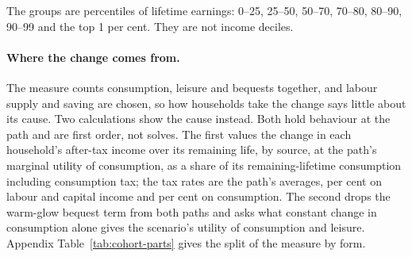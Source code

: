 The groups are percentiles of lifetime earnings: 0--25, 25--50, 50--70, 70--80, 80--90, 90--99 and the top 1 per cent. They are not income deciles.

\paragraph{Where the change comes from.} The measure counts consumption, leisure and bequests together, and labour supply and saving are chosen, so how households take the change says little about its cause. Two calculations show the cause instead. Both hold behaviour at the path and are first order, not solves. The first values the change in each household's after-tax income over its remaining life, by source, at the path's marginal utility of consumption, as a share of its remaining-lifetime consumption including consumption tax; the tax rates are the path's averages, \genCohTaxIncPctCentral{} per cent on labour and capital income and \genCohTaxConsPctCentral{} per cent on consumption. The second drops the warm-glow bequest term from both paths and asks what constant change in consumption alone gives the scenario's utility of consumption and leisure. Appendix Table~\ref{tab:cohort-parts} gives the split of the measure by form.

